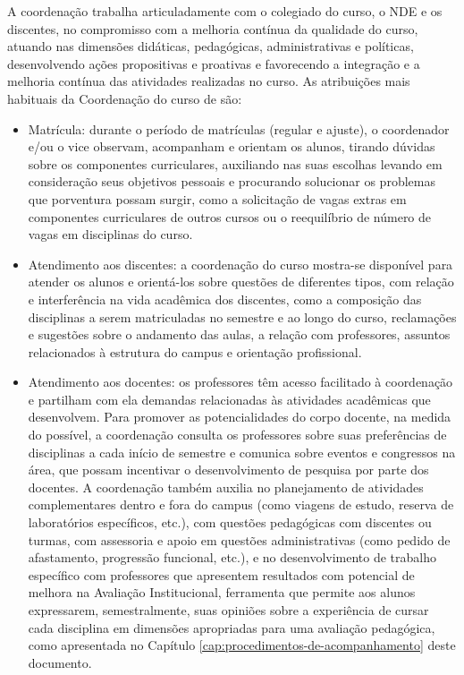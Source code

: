 A coordenação trabalha articuladamente com o colegiado do curso, o NDE e os discentes, no compromisso com a melhoria contínua da qualidade do curso, atuando nas dimensões didáticas, pedagógicas, administrativas e políticas, desenvolvendo ações propositivas e proativas e favorecendo a integração e a melhoria contínua das atividades realizadas no curso. As atribuições mais habituais da Coordenação do curso de \nomedocurso são:
\begin{itemize}
    \item Matrícula: durante o período de matrículas (regular e ajuste), o coordenador e/ou o vice observam, acompanham e orientam os alunos, tirando dúvidas sobre os componentes curriculares, auxiliando nas suas escolhas levando em consideração seus objetivos pessoais e procurando solucionar os problemas que porventura possam surgir, como a solicitação de vagas extras em componentes curriculares de outros cursos ou o reequilíbrio de número de vagas em disciplinas do curso.

    \item Atendimento aos discentes: a coordenação do curso mostra-se disponível para atender os alunos e orientá-los sobre questões de diferentes tipos, com relação e interferência na vida acadêmica dos discentes, como a composição das disciplinas a serem matriculadas no semestre e ao longo do curso, reclamações e sugestões sobre o andamento das aulas, a relação com professores, assuntos relacionados à estrutura do campus e orientação profissional.

    \item Atendimento aos docentes: os professores têm acesso facilitado à coordenação e partilham com ela demandas relacionadas às atividades acadêmicas que desenvolvem. Para promover as potencialidades do corpo docente, na medida do possível, a coordenação consulta os professores sobre suas preferências de disciplinas a cada início de semestre e comunica sobre eventos e congressos na área, que possam incentivar o desenvolvimento de pesquisa por parte dos docentes. A coordenação também auxilia no planejamento de atividades complementares dentro e fora do campus (como viagens de estudo, reserva de laboratórios específicos, etc.), com questões pedagógicas com discentes ou turmas, com assessoria e apoio em questões administrativas (como pedido de afastamento, progressão funcional, etc.), e no desenvolvimento de trabalho específico com professores que apresentem resultados com potencial de melhora na Avaliação Institucional, ferramenta que permite aos alunos expressarem, semestralmente, suas opiniões sobre a experiência de cursar cada disciplina em dimensões apropriadas para uma avaliação pedagógica, como apresentada no Capítulo \ref{cap:procedimentos-de-acompanhamento} deste documento.


\end{itemize}
